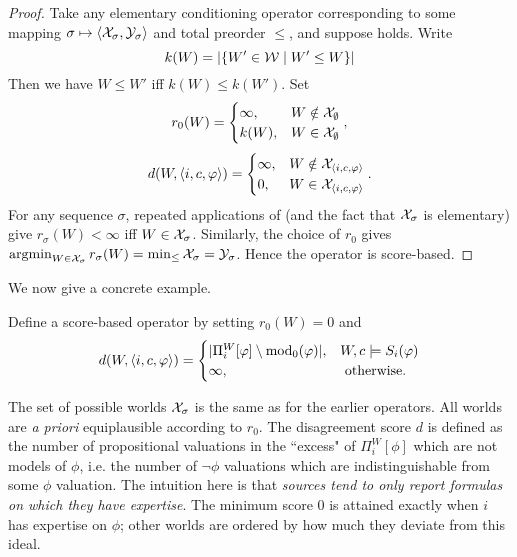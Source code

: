 \begin{proof}
    Take any elementary conditioning operator corresponding to some mapping
    $\sigma \mapsto \langle {\mathcal{X}_\sigma, \mathcal{Y}_\sigma} \rangle$ and total preorder $\le$, and
    suppose \kconj{} holds. Write
    \[
        k(W) = |\{W' \in \mathcal{W} \mid W' \le W\}|
    \]
    Then we have $W \le W'$ iff $k(W) \le k(W')$. Set
    \[
        r_0(W) = \begin{cases}
            \infty,& W \notin \mathcal{X}_\emptyset \\
            k(W),& W \in \mathcal{X}_\emptyset
        \end{cases},
    \]
    \[
        d(W, \langle {i, c, \varphi} \rangle) = \begin{cases}
            \infty,& W \notin \mathcal{X}_{\langle {i, c, \varphi} \rangle} \\
            0,& W \in \mathcal{X}_{\langle {i, c, \varphi} \rangle} \\
        \end{cases}.
    \]
    For any sequence $\sigma$, repeated applications of \kconj{} (and the fact
    that $\mathcal{X}_\sigma$ is elementary) give $r_\sigma(W) < \infty$ iff $W \in
    \mathcal{X}_\sigma$. Similarly, the choice of $r_0$ gives $\operatorname{argmin}_{W \in
    \mathcal{X}_\sigma}{r_\sigma(W)} = \min_{\le}{\mathcal{X}_\sigma} = \mathcal{Y}_\sigma$. Hence the
    operator is score-based.

\end{proof}

We now give a concrete example.

\begin{definition}
    \label{def:scorebasedop}
    Define a score-based operator \scorebasedop{} by setting
    $r_0(W) = 0$ and
    \[
        d(W, \langle {i, c, \varphi} \rangle) = \begin{cases}
            |\Pi^W_i[\varphi] \setminus \operatorname{mod}_0(\varphi)|,& W, c \models S_i(\varphi) \\
            \infty,& \text{ otherwise. }
        \end{cases}
    \]
\end{definition}

The set of possible worlds $\mathcal{X}_\sigma$ is the same as for the earlier
operators.
All worlds are \emph{a priori} equiplausible according to
$r_0$. The disagreement score $d$ is defined as the number of propositional
valuations in the ``excess" of $\Pi^W_i[\phi]$ which are not models of
$\phi$, i.e. the number of $\neg\phi$ valuations which are indistinguishable
from some $\phi$ valuation.
%
The intuition here is that \emph{sources tend to only report formulas on which
they have expertise}. The minimum score 0 is attained exactly when $i$ has
expertise on $\phi$; other worlds are ordered by how much they deviate from
this ideal.

